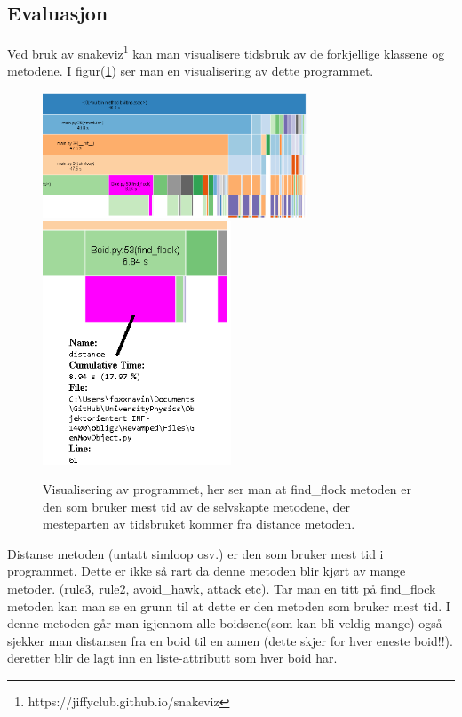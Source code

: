 {\subsection{Evaluasjon}

Ved bruk av snakeviz\footnote{https://jiffyclub.github.io/snakeviz} kan man visualisere tidsbruk av de forkjellige klassene og metodene. I figur(\ref{Evaluasjon}) ser man en visualisering av dette programmet.

\begin{figure}[hbt!]
{\centering
    \includegraphics[width=0.70\textwidth]{systeminfo.png}
    \includegraphics[width=0.50\textwidth]{systeminfo2.png}
    \caption{Visualisering av programmet, her ser man at find\_flock metoden er den som bruker mest tid av de selvskapte metodene, der mesteparten av tidsbruket kommer fra distance metoden.}
    \label{Evaluasjon}
\par}
\end{figure}

Distanse metoden (untatt simloop osv.) er den som bruker mest tid i programmet. Dette er ikke så rart da denne metoden blir kjørt av mange metoder. (rule3, rule2, avoid\_hawk, attack etc). Tar man en titt på find\_flock metoden kan man se en grunn til at dette er den metoden som bruker mest tid. I denne metoden går man igjennom alle boidsene(som kan bli veldig mange) også sjekker man distansen fra en boid til en annen (dette skjer for hver eneste boid!!). deretter blir de lagt inn en liste-attributt som hver boid har.


}
